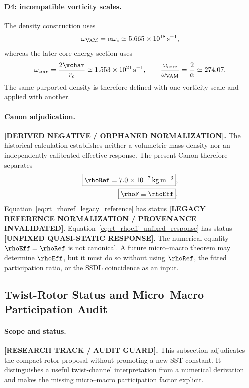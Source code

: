 \paragraph{D4: incompatible vorticity scales.}
The density construction uses
\begin{align}
    \omega_{\rm VAM}
    =
    \alpha\omega_c
    \simeq
    5.665\times10^{18}\,\mathrm{s^{-1}},
\end{align}
whereas the later core-energy section uses
\begin{align}
    \omega_{\rm core}
    =
    \frac{2\vchar}{r_c}
    \simeq
    1.553\times10^{21}\,\mathrm{s^{-1}},
    \qquad
    \frac{\omega_{\rm core}}{\omega_{\rm VAM}}
    =
    \frac{2}{\alpha}
    \simeq
    274.07.
\end{align}
The same purported density is therefore defined with one vorticity scale and
applied with another.

\paragraph{Canon adjudication.}
\textbf{[DERIVED NEGATIVE / ORPHANED NORMALIZATION].}
The historical calculation establishes neither a volumetric mass density nor
an independently calibrated effective response.  The present Canon therefore
separates
\begin{align}
    \boxed{
    \rhoRef
    =
    7.0\times10^{-7}\,\mathrm{kg\,m^{-3}}
    },
    \label{eq:rt_rhoref_legacy_reference}
    \\
    \boxed{
    \rhoF\equiv\rhoEff
    }.
    \label{eq:rt_rhoeff_unfixed_response}
\end{align}
Equation~\eqref{eq:rt_rhoref_legacy_reference} has status
\textbf{[LEGACY REFERENCE NORMALIZATION / PROVENANCE INVALIDATED]}.
Equation~\eqref{eq:rt_rhoeff_unfixed_response} has status
\textbf{[UNFIXED QUASI-STATIC RESPONSE]}.
The numerical equality \(\rhoEff=\rhoRef\) is not canonical.  A future
micro--macro theorem may determine \(\rhoEff\), but it must do so without
using \(\rhoRef\), the fitted participation ratio, or the SSDL coincidence as
an input.

\subsection{Twist-Rotor Status and Micro--Macro Participation Audit}
\label{subsec:rt_twist_rotor_participation_audit}

\paragraph{Scope and status.}
\textbf{[RESEARCH TRACK / AUDIT GUARD].}
This subsection adjudicates the compact-rotor proposal without promoting a
new SST constant.  It distinguishes a useful twist-channel interpretation
from a numerical derivation and makes the missing micro--macro participation
factor explicit.

